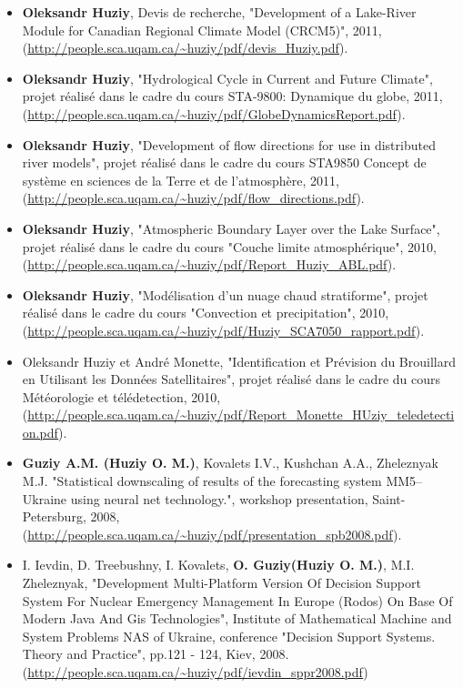 \documentclass[12pt,a4paper,sans]{moderncv}
\begin{document}
\begin{itemize}
    \item \textbf{Oleksandr Huziy}, Devis de recherche, "Development of a
    Lake-River Module for Canadian Regional Climate Model (CRCM5)", 2011,
    (\url{http://people.sca.uqam.ca/~huziy/pdf/devis_Huziy.pdf}).
   
    \item \textbf{Oleksandr Huziy}, "Hydrological Cycle in Current and Future Climate",
    projet réalisé dans le cadre du cours STA-9800: Dynamique du globe, 2011,\\
     (\url{http://people.sca.uqam.ca/~huziy/pdf/GlobeDynamicsReport.pdf}).
   
    \item \textbf{Oleksandr Huziy}, "Development of flow directions for use in
    distributed river models", projet réalisé dans le cadre du cours STA9850
    Concept de système en sciences de la Terre et de l'atmosphère, 2011,
    (\url{http://people.sca.uqam.ca/~huziy/pdf/flow_directions.pdf}).
   
    \item \textbf{Oleksandr Huziy}, "Atmospheric Boundary Layer over the Lake Surface",
           projet réalisé dans le cadre du cours "Couche limite atmosphérique",
           2010, (\url{http://people.sca.uqam.ca/~huziy/pdf/Report_Huziy_ABL.pdf}).
   
    \item \textbf{Oleksandr Huziy}, "Modélisation d’un nuage chaud stratiforme",
       projet réalisé dans le cadre du cours "Convection et precipitation", 2010,
       (\url{http://people.sca.uqam.ca/~huziy/pdf/Huziy_SCA7050_rapport.pdf}).

    \item Oleksandr Huziy et André Monette, "Identification et Prévision du
    Brouillard en Utilisant les Données Satellitaires", projet réalisé dans le cadre du cours Météorologie et télédetection,
       2010, (\url{http://people.sca.uqam.ca/~huziy/pdf/Report_Monette_HUziy_teledetection.pdf}).

    \item \textbf{Guziy A.M. (Huziy O. M.)}, Kovalets I.V., Kushchan A.A.,
    Zheleznyak M.J.
    "Statistical downscaling of results of the forecasting system MM5–Ukraine using neural net technology.",
    workshop presentation, Saint-Petersburg, 2008, (\url{http://people.sca.uqam.ca/~huziy/pdf/presentation_spb2008.pdf}).

    \item I. Ievdin, D. Treebushny, I. Kovalets, \textbf{O. Guziy(Huziy O. M.)}, M.I.
    Zheleznyak, "Development Multi-Platform Version Of Decision Support System For Nuclear Emergency Management In Europe (Rodos)
    On Base Of Modern Java And Gis Technologies", 
    Institute of Mathematical Machine and System Problems NAS of Ukraine, conference
    "Decision Support Systems. Theory and Practice", pp.121 - 124, Kiev, 2008.
     (\url{http://people.sca.uqam.ca/~huziy/pdf/ievdin_sppr2008.pdf})

\end{itemize}
\end{document}
